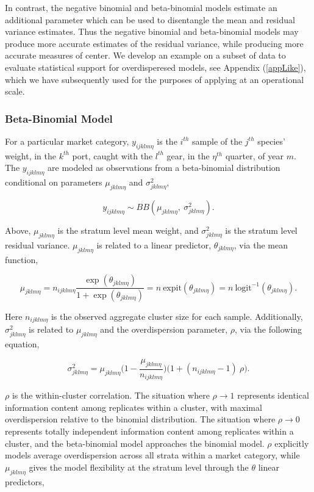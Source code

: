 \documentclass[12pt]{article}
\begin{document}
In contrast, the negative binomial and beta-binomial models estimate an
additional parameter which can be used to disentangle the mean and
residual variance estimates. Thus the negative binomial and
beta-binomial models may produce more accurate estimates of the residual
variance, while producing more accurate measures of center. We develop
an example on a subset of data to evaluate statistical support for 
overdisperesed models, see Appendix (\ref{appLike}), which we have 
subsequently used for the purposes of applying at an operational scale.

\subsubsection{Beta-Binomial Model}\label{bbModel}

For a particular market category, \(y_{ijklm\eta}\) is the \(i^{th}\)
sample of the \(j^{th}\) species' weight, in the \(k^{th}\) port, caught
with the \(l^{th}\) gear, in the \(\eta^{th}\) quarter, of year \(m\).
The \(y_{ijklm\eta}\) are modeled as observations from a beta-binomial 
distribution conditional on parameters \(\mu_{jklm\eta}\) and 
\(\sigma^2_{jklm\eta}\),

\[y_{ijklm\eta} \sim BB(\mu_{jklm\eta},~\sigma^2_{jklm\eta}).\]

Above, \(\mu_{jklm\eta}\) is the stratum level mean weight, and
\(\sigma^2_{jklm\eta}\) is the stratum level residual variance.
\(\mu_{jklm\eta}\) is related to a linear predictor,
\(\theta_{jklm\eta}\), via the mean function,

\[\mu_{jklm\eta} = n_{ijklm\eta}\frac{\exp(\theta_{jklm\eta})}{1+\exp(\theta_{jklm\eta})}=n~\text{expit}(\theta_{jklm\eta})=n~\text{logit}^{-1}(\theta_{jklm\eta}).\]

Here \(n_{ijklm\eta}\) is the observed aggregate cluster size for each
sample. Additionally, \(\sigma^2_{jklm\eta}\) is related to
\(\mu_{jklm\eta}\) and the overdispersion parameter, \(\rho\), via the
following equation,

\[\sigma^2_{jklm\eta} = \mu_{jklm\eta}\Big(1-\frac{\mu_{jklm\eta}}{n_{ijklm\eta}}\Big)\Big(1+(n_{ijklm\eta}-1)~\rho\Big).\]

\(\rho\) is the within-cluster correlation. The situation where
\(\rho\rightarrow1\) represents identical information content among
replicates within a cluster, with maximal overdispersion relative to the
binomial distribution. The situation where \(\rho\rightarrow0\)
represents totally independent information content among replicates
within a cluster, and the beta-binomial model approaches the binomial
model. \(\rho\) explicitly models average overdispersion across all
strata within a market category, while \(\mu_{jklm\eta}\) gives the
model flexibility at the stratum level through the \(\theta\) linear
predictors,
\end{document}
